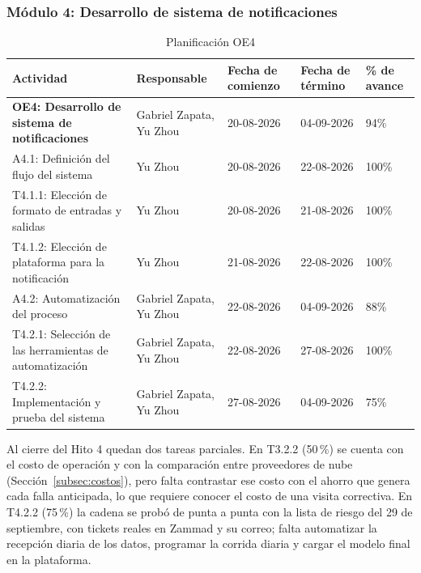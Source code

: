 \documentclass[12pt,a4paper]{article}
\begin{document}
    \subsubsection{Módulo 4: Desarrollo de sistema de notificaciones}
    \begin{table}[H]
            \centering
            \renewcommand{\arraystretch}{1.5}
            \begin{tabular}{|p{5cm}|p{3cm}|p{2cm}|p{2cm}|p{2cm}|}
            \hline
            \textbf{Actividad} & \textbf{Responsable} & \textbf{Fecha de comienzo} & \textbf{Fecha de término} & \textbf{\% de avance} \\ \hline
            \textbf{OE4: Desarrollo de sistema de notificaciones} & Gabriel Zapata, Yu Zhou & 20-08-2026 & 04-09-2026 & 94\% \\ \hline
            A4.1: Definición del flujo del sistema & Yu Zhou & 20-08-2026 & 22-08-2026 & 100\% \\ \hline
            T4.1.1: Elección de formato de entradas y salidas & Yu Zhou & 20-08-2026 & 21-08-2026 & 100\% \\ \hline
            T4.1.2: Elección de plataforma para la notificación & Yu Zhou & 21-08-2026 & 22-08-2026 & 100\% \\ \hline
            A4.2: Automatización del proceso & Gabriel Zapata, Yu Zhou & 22-08-2026 & 04-09-2026 & 88\% \\ \hline
            T4.2.1: Selección de las herramientas de automatización & Gabriel Zapata, Yu Zhou & 22-08-2026 & 27-08-2026 & 100\% \\ \hline
            T4.2.2: Implementación y prueba del sistema & Gabriel Zapata, Yu Zhou & 27-08-2026 & 04-09-2026 & 75\% \\ \hline
            \end{tabular}
            \caption{Planificación OE4}
            \label{tab:planificacion_avance_oe4}
    \end{table}

    \noindent
    Al cierre del Hito 4 quedan dos tareas parciales. En T3.2.2 (50\,\%) se cuenta con el costo de operación y con la comparación entre proveedores de nube (Sección~\ref{subsec:costos}), pero falta contrastar ese costo con el ahorro que genera cada falla anticipada, lo que requiere conocer el costo de una visita correctiva. En T4.2.2 (75\,\%) la cadena se probó de punta a punta con la lista de riesgo del 29 de septiembre, con tickets reales en Zammad y su correo; falta automatizar la recepción diaria de los datos, programar la corrida diaria y cargar el modelo final en la plataforma.
\end{document}
